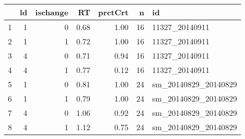 \begin{tiny}
\begin{table}[ht]
\centering
\begin{tabular}{rrrrrrl}
  \hline
 & ld & ischange & RT & prctCrt & n & id \\ 
  \hline
1 &   1 &   0 & 0.68 & 1.00 &  16 & 11327\_20140911 \\ 
  2 &   1 &   1 & 0.72 & 1.00 &  16 & 11327\_20140911 \\ 
  3 &   4 &   0 & 0.71 & 0.94 &  16 & 11327\_20140911 \\ 
  4 &   4 &   1 & 0.77 & 0.12 &  16 & 11327\_20140911 \\ 
  5 &   1 &   0 & 0.81 & 1.00 &  24 & sm\_20140829\_20140829 \\ 
  6 &   1 &   1 & 0.79 & 1.00 &  24 & sm\_20140829\_20140829 \\ 
  7 &   4 &   0 & 1.06 & 0.92 &  24 & sm\_20140829\_20140829 \\ 
  8 &   4 &   1 & 1.12 & 0.75 &  24 & sm\_20140829\_20140829 \\ 
   \hline
\end{tabular}
\end{table}
\end{tiny}
